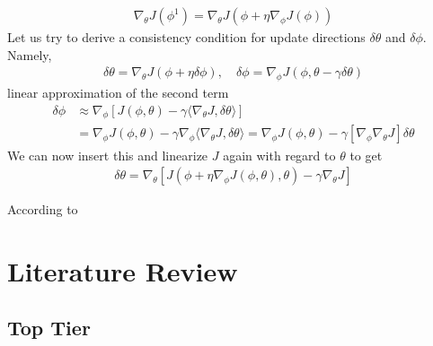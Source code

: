 \documentclass{article}
\begin{document}
\begin{enumerate}
\begin{align}
\nabla_\theta J(\phi^1) = \nabla_\theta J(\phi + \eta \nabla_\phi J(\phi))
\end{align}
Let us try to derive a consistency condition for update directions $\delta \theta$  and $\delta \phi$. Namely,
\begin{align}
\delta \theta = \nabla_\theta J(\phi + \eta \delta \phi), \quad 
\delta \phi = \nabla_\phi J(\phi, \theta - \gamma \delta \theta)
\end{align}
linear approximation of the second term
\begin{align}
\delta \phi 
& \approx \nabla_\phi \left[ J(\phi,\theta) - \gamma \langle \nabla _\theta J, \delta \theta \rangle \right] \\
& = \nabla_\phi J(\phi,\theta) - \gamma \nabla_\phi \langle \nabla _\theta J, \delta \theta \rangle 
= \nabla_\phi J(\phi,\theta) - \gamma [\nabla_\phi \nabla _\theta J]  \delta \theta 
\end{align}
We can now insert this and linearize $J$ again with regard to $\theta$ to get 
\begin{align}
\delta \theta = \nabla_\theta 
\left[ 
J(\phi + \eta \nabla_\phi J(\phi,\theta),\theta) - \gamma \nabla_\theta J
\right]
\end{align}

According to \cite[Eq.~(12)]{metz2016unrolled} 
\end{enumerate}

\section{Literature Review}

\subsection{Top Tier}
\end{document}
